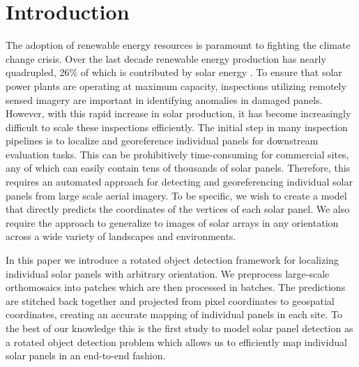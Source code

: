 

\section{Introduction}

The adoption of renewable energy resources is paramount to fighting the climate change crisis. Over the last decade renewable energy production has nearly quadrupled, 26\% of which is contributed by solar energy \citep{renewables}. To ensure that solar power plants are operating at maximum capacity, inspections utilizing remotely sensed imagery are important in identifying anomalies in damaged panels. However, with this rapid increase in solar production, it has become increasingly difficult to scale these inspections efficiently. The initial step in many inspection pipelines is to localize and georeference individual panels for downstream evaluation tasks. This can be prohibitively time-consuming for commercial sites, any of which can easily contain tens of thousands of solar panels. Therefore, this requires an automated approach for detecting and georeferencing individual solar panels from large scale aerial imagery. To be specific, we wish to create a model that directly predicts the coordinates of the vertices of each solar panel. We also require the approach to generalize to images of solar arrays in any orientation across a wide variety of landscapes and environments.

In this paper we introduce a rotated object detection framework for localizing individual solar panels with arbitrary orientation. We preprocess large-scale orthomosaics into patches which are then processed in batches. The predictions are stitched back together and projected from pixel coordinates to geospatial coordinates, creating an accurate mapping of individual panels in each site. To the best of our knowledge this is the first study to model solar panel detection as a rotated object detection problem which allows us to efficiently map individual solar panels in an end-to-end fashion. 